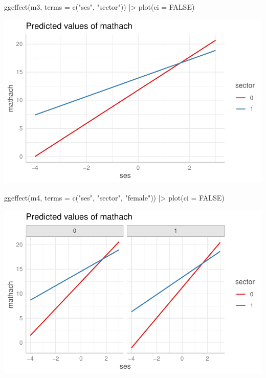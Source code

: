 \documentclass[
  letterpaper,
  DIV=11,
  numbers=noendperiod]{scrreprt}
\newenvironment{Shaded}{}{}
\newcommand{\AttributeTok}[1]{\textcolor[rgb]{0.49,0.56,0.16}{#1}}
\newcommand{\ConstantTok}[1]{\textcolor[rgb]{0.53,0.00,0.00}{#1}}
\newcommand{\FunctionTok}[1]{\textcolor[rgb]{0.02,0.16,0.49}{#1}}
\newcommand{\NormalTok}[1]{#1}
\newcommand{\SpecialCharTok}[1]{\textcolor[rgb]{0.25,0.44,0.63}{#1}}
\newcommand{\StringTok}[1]{\textcolor[rgb]{0.25,0.44,0.63}{#1}}
\begin{document}
\begin{Shaded}
\begin{Highlighting}[]
\FunctionTok{ggeffect}\NormalTok{(m3, }\AttributeTok{terms =} \FunctionTok{c}\NormalTok{(}\StringTok{"ses"}\NormalTok{, }\StringTok{"sector"}\NormalTok{)) }\SpecialCharTok{|\textgreater{}} 
  \FunctionTok{plot}\NormalTok{(}\AttributeTok{ci =} \ConstantTok{FALSE}\NormalTok{)}
\end{Highlighting}
\end{Shaded}

\includegraphics{ggeffects_files/figure-pdf/unnamed-chunk-6-2.pdf}

\begin{Shaded}
\begin{Highlighting}[]
\FunctionTok{ggeffect}\NormalTok{(m4, }\AttributeTok{terms =} \FunctionTok{c}\NormalTok{(}\StringTok{"ses"}\NormalTok{, }\StringTok{"sector"}\NormalTok{, }\StringTok{"female"}\NormalTok{)) }\SpecialCharTok{|\textgreater{}} 
  \FunctionTok{plot}\NormalTok{(}\AttributeTok{ci =} \ConstantTok{FALSE}\NormalTok{)}
\end{Highlighting}
\end{Shaded}

\includegraphics{ggeffects_files/figure-pdf/unnamed-chunk-6-3.pdf}
\end{document}
